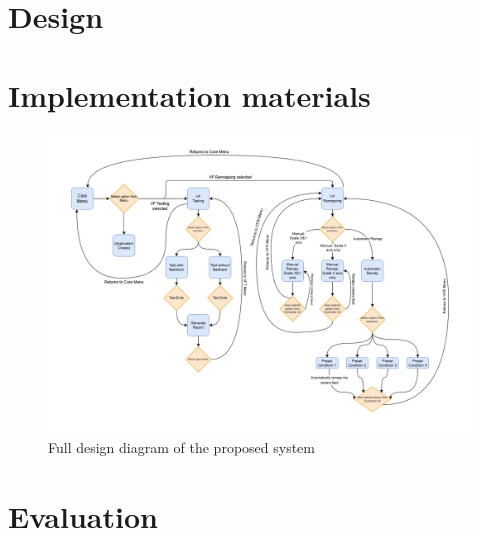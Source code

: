 \documentclass{l4proj}
\begin{document}
\begin{appendices}
\section{Design}
\section{Implementation materials}
\begin{figure}[!h]
    \centering
    \includegraphics[width=0.8\paperwidth]{images/Design_Diagram.png}    

    \caption{Full design diagram of the proposed system}
\end{figure}
\newpage


\section{Evaluation}

\newpage

\end{appendices}
\end{document}
